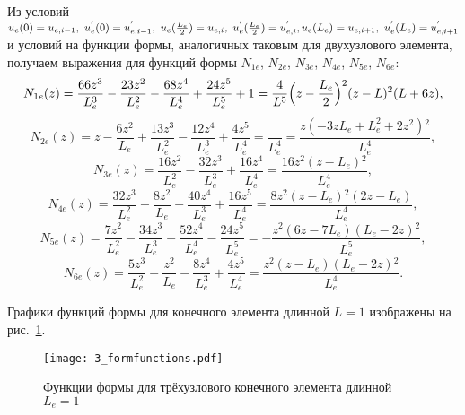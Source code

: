 \documentclass[12pt,a4paper]{article}
\begin{document}
	
Из условий $u_e(0)=u_{e, i-1},~ u_e^{'}(0)=u^{'}_{e, i-1},~ u_{e}(\frac{L_e}{2})=u_{e,i},~ u_{e}^{'}(\frac{L_e}{2})=u^{'}_{e,i},\\
 u_{e}(L_e)=u_{e,i+1},~ u_{e}^{'}(L_e)=u^{'}_{e,i+1}$ и
условий на функции формы, аналогичных таковым для двухузлового элемента,
получаем выражения для функций формы $N_{1e}$, $N_{2e}$, $N_{3e}$, $N_{4e}$, $N_{5e}$, $N_{6e}$:
$$N_{1e}(z)=\frac{66z^{3}}{L_e^{3}}-\frac{23z^{2}}{L_e^{2}}-\frac{68z^{4}}{L_e^{4}}+\frac{24z^{5}}{L_e^{5}}+1= \frac{4}{L^5}\Bigl( z-\frac{L_e}{2} \Bigr)^2(z-L)^2(L+6z),$$
$$N_{2e}(z)=z-\frac{6z^{2}}{L_e}+\frac{13z^{3}}{L_e^{2}}-\frac{12z^{4}}{L_e^{3}}+\frac{4z^{5}}{L_e^{4}}=\frac{}{L_e^4}=\frac{z \left(-3 z L_e+L_e^2+2 z^2\right){}^2}{L_e^4},$$
$$N_{3e}(z)=\frac{16z^{2}}{L_e^{2}}-\frac{32z^{3}}{L_e^{3}}+\frac{16z^{4}}{L_e^{4}}=\frac{16 z^2 \left(z-L_e\right){}^2}{L_e^4},$$
$$N_{4e}(z)=\frac{32z^{3}}{L_e^{2}}-\frac{8z^{2}}{L_e}-\frac{40z^{4}}{L_e^{3}}+\frac{16z^{5}}{L_e^{4}}=\frac{8 z^2 \left(z-L_e\right){}^2 \left(2 z-L_e\right)}{L_e^4},$$
$$N_{5e}(z)=\frac{7z^{2}}{L_e^{2}}-\frac{34z^{3}}{L_e^{3}}+\frac{52z^{4}}{L_e^{4}}-\frac{24z^{5}}{L_e^{5}}=-\frac{z^2 \left(6 z-7 L_e\right) \left(L_e-2 z\right){}^2}{L_e^5},$$
$$N_{6e}(z)=\frac{5z^{3}}{L_e^{2}}-\frac{z^{2}}{L_e}-\frac{8z^{4}}{L_e^{3}}+\frac{4z^{5}}{L_e^{4}}=\frac{z^2 \left(z-L_e\right) \left(L_e-2 z\right){}^2}{L_e^4}.$$  

Графики функций формы для конечного элемента длинной $L=1$ изображены на рис.~\ref{fig:3_formfunctions}.

\begin{figure}[H]
		\centering
		\texttt{[image: 3\_formfunctions.pdf]}
		\caption{Функции формы для трёхузлового конечного элемента длинной $L_{e}=1$}
		\label{fig:3_formfunctions}
	\end{figure}
\end{document}
